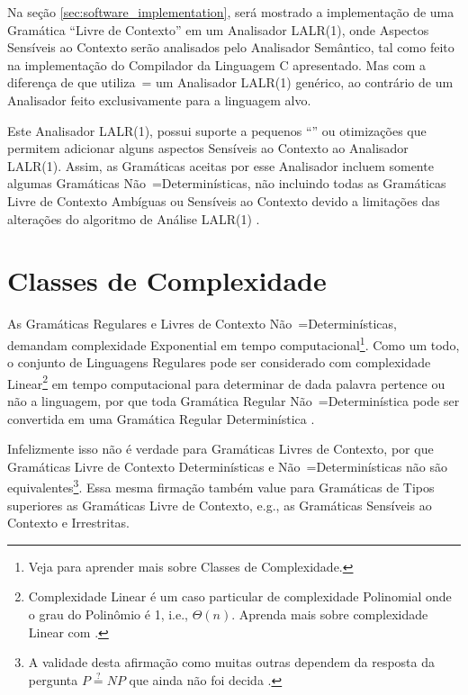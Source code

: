 {    Na seção \ref{sec:software_implementation},
    será mostrado a implementação de uma Gramática ``Livre de Contexto'' em um Analisador LALR(1),
    onde Aspectos Sensíveis ao Contexto serão analisados pelo Analisador Semântico,
    tal como feito na implementação do Compilador da Linguagem C apresentado.
    Mas com a diferença de que utiliza~= um Analisador LALR(1) genérico,
    ao contrário de um Analisador feito exclusivamente para a linguagem alvo.

    Este Analisador LALR(1),
    possui suporte a pequenos ``\textit{}'' ou
    otimizações que permitem adicionar alguns aspectos Sensíveis ao Contexto ao Analisador LALR(1).
    Assim,
    as Gramáticas aceitas por esse Analisador incluem somente algumas Gramáticas Não~=Determinísticas,
    não incluindo todas as Gramáticas Livre de Contexto Ambíguas ou
    Sensíveis ao Contexto devido a limitações das alterações do algoritmo de Análise LALR(1) \cite{larkContextualLexer}.


\section{Classes de Complexidade}
\label{classesDeComplexidade}

    As Gramáticas Regulares e
    Livres de Contexto Não~=Determinísticas,
    demandam complexidade Exponential em tempo computacional\footnote{
    Veja  para aprender mais sobre Classes de Complexidade.
    }.
    Como um todo,
    o conjunto de Linguagens Regulares pode ser considerado com complexidade Linear\footnote{
    Complexidade Linear é um caso particular de complexidade Polinomial onde o grau do Polinômio é 1,
    i.e.,
    $\Theta(n)$.
    Aprenda mais sobre complexidade Linear com .
    }
    em tempo computacional para determinar de dada palavra pertence ou
    não a linguagem,
    por que toda Gramática Regular Não~=Determinística pode ser convertida em uma Gramática Regular Determinística \cite{sipserBook}.

    Infelizmente isso não é verdade para Gramáticas Livres de Contexto,
    por que Gramáticas Livre de Contexto Determinísticas e
    Não~=Determinísticas não são equivalentes\footnote{
    A validade desta afirmação como muitas outras dependem da resposta da pergunta $P \stackrel{?}{=} NP$ que ainda não foi decida \cite{computationalComplexityAuroraBarak}.
    }.
    Essa mesma firmação também value para Gramáticas de Tipos superiores as Gramáticas Livre de Contexto,
    e.g.,
    as Gramáticas Sensíveis ao Contexto e
    Irrestritas.

}
